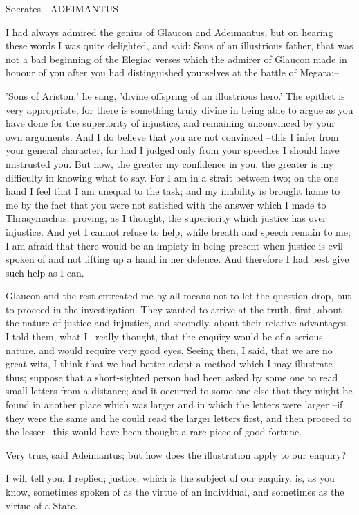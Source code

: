 Socrates - ADEIMANTUS

I had always admired the genius of Glaucon and Adeimantus, but on hearing these words I was quite delighted, and said: Sons of an illustrious father, that was not a bad beginning of the Elegiac verses which the admirer of Glaucon made in honour of you after you had distinguished yourselves at the battle of Megara:--

'Sons of Ariston,' he sang, 'divine offspring of an illustrious hero.' The epithet is very appropriate, for there is something truly divine in being able to argue as you have done for the superiority of injustice, and remaining unconvinced by your own arguments. And I do believe that you are not convinced --this I infer from your general character, for had I judged only from your speeches I should have mistrusted you. But now, the greater my confidence in you, the greater is my difficulty in knowing what to say. For I am in a strait between two; on the one hand I feel that I am unequal to the task; and my inability is brought home to me by the fact that you were not satisfied with the answer which I made to Thrasymachus, proving, as I thought, the superiority which justice has over injustice. And yet I cannot refuse to help, while breath and speech remain to me; I am afraid that there would be an impiety in being present when justice is evil spoken of and not lifting up a hand in her defence. And therefore I had best give such help as I can.

Glaucon and the rest entreated me by all means not to let the question drop, but to proceed in the investigation. They wanted to arrive at the truth, first, about the nature of justice and injustice, and secondly, about their relative advantages. I told them, what I --really thought, that the enquiry would be of a serious nature, and would require very good eyes. Seeing then, I said, that we are no great wits, I think that we had better adopt a method which I may illustrate thus; suppose that a short-sighted person had been asked by some one to read small letters from a distance; and it occurred to some one else that they might be found in another place which was larger and in which the letters were larger --if they were the same and he could read the larger letters first, and then proceed to the lesser --this would have been thought a rare piece of good fortune.

Very true, said Adeimantus; but how does the illustration apply to our enquiry?

I will tell you, I replied; justice, which is the subject of our enquiry, is, as you know, sometimes spoken of as the virtue of an individual, and sometimes as the virtue of a State.

